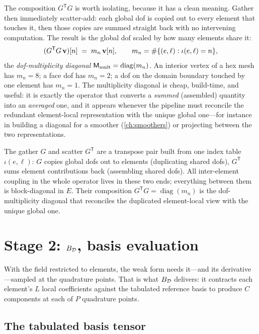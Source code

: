 The composition $G^{\mathsf T}G$ is worth isolating, because it has a clean
meaning. Gather then immediately scatter-add: each global dof is copied out to
every element that touches it, then those copies are summed straight back with no
intervening computation. The result is the global dof scaled by how many elements
share it:
\begin{equation}
  (G^{\mathsf T}G\,\mathbf{v})[n] \;=\; m_n\,\mathbf{v}[n],
  \qquad m_n = \#\{(e,\ell): \iota(e,\ell)=n\},
  \label{eq:appk-mult}
\end{equation}
the \emph{dof-multiplicity diagonal} $\mathsf{M}_{\mathrm{mult}}=\operatorname{diag}(m_n)$.
An interior vertex of a hex mesh has $m_n=8$; a face dof has $m_n=2$; a dof on the
domain boundary touched by one element has $m_n=1$. The multiplicity diagonal is
cheap, build-time, and useful: it is exactly the operator that converts a
\emph{summed} (assembled) quantity into an \emph{averaged} one, and it appears
whenever the pipeline must reconcile the redundant element-local representation
with the unique global one---for instance in building a diagonal for a smoother
(\cref{ch:smoothers}) or projecting between the two representations.

\begin{keyidea}
The gather $G$ and scatter $G^{\mathsf T}$ are a transpose pair built from one
index table $\iota(e,\ell)$: $G$ copies global dofs out to elements (duplicating
shared dofs), $G^{\mathsf T}$ sums element contributions back (assembling shared
dofs). All inter-element coupling in the whole operator lives in these two ends;
everything between them is block-diagonal in $E$. Their composition
$G^{\mathsf T}G=\operatorname{diag}(m_n)$ is the dof-multiplicity diagonal that
reconciles the duplicated element-local view with the unique global one.
\end{keyidea}

\section{Stage 2: \texorpdfstring{$B_{\mathcal{D}}$}{B}, basis evaluation}
\label{sec:appk-basis}

With the field restricted to elements, the weak form needs it---and its
derivative---sampled at the quadrature points. That is what $B_{\mathcal{D}}$ delivers:
it contracts each element's $L$ local coefficients against the tabulated reference
basis to produce $C$ components at each of $P$ quadrature points.

\subsection{The tabulated basis tensor}

